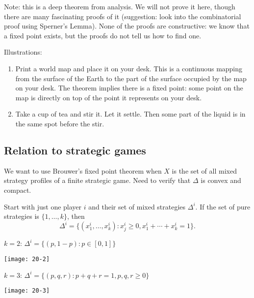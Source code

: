 \documentclass[12pt,letterpaper]{report}
\begin{document}
Note: this is a deep theorem from analysis.
We will not prove it here, though there are many fascinating proofs of it (suggestion: look into the
combinatorial proof using Sperner's Lemma).
None of the proofs are constructive: we know that a fixed point exists, but the proofs do not tell
us how to find one.

Illustrations:
\begin{enumerate}
  \item
  Print a world map and place it on your desk.
  This is a continuous mapping from the surface of the Earth to the part of the surface occupied by
  the map on your desk.
  The theorem implies there is a fixed point: some point on the map is directly on top of the point
  it represents on your desk.
  \item
  Take a cup of tea and stir it.
  Let it settle.
  Then some part of the liquid is in the same spot before the stir.
\end{enumerate}

\subsection{Relation to strategic games}

We want to use Brouwer's fixed point theorem when $X$ is the set of all mixed strategy profiles of
a finite strategic game.
Need to verify that $\Delta$ is convex and compact.

Start with just one player $i$ and their set of mixed strategies $\Delta^i$.
If the set of pure strategies is $\{1, \ldots, k\}$, then
\[
  \Delta^i = \{ (x_1^i, \ldots, x_k^i) : x_j^i \geq 0, x_1^i + \cdots + x_k^i = 1 \}.
\]

\begin{minipage}[t]{0.4\textwidth}
  $k = 2$: $\Delta^i = \{(p, 1 - p) : p \in [0, 1]\}$

  \vspace{\baselineskip}
  \begin{center}
    \texttt{[image: 20-2]}
  \end{center}
\end{minipage}\hfill\begin{minipage}[t]{0.55\textwidth}
  $k = 3$: $\Delta^i = \{(p, q, r) : p + q + r = 1, p, q, r \geq 0\}$

  \vspace{\baselineskip}
  \begin{center}
    \texttt{[image: 20-3]}
  \end{center}
\end{minipage}
\end{document}
